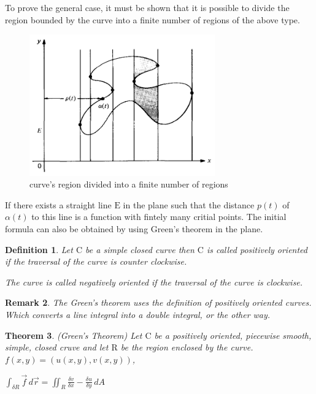 \documentclass[a4paper]{book}
\newtheorem{theorem}{Theorem}%
\newtheorem{remark}[theorem]{Remark}%
\newtheorem{definition}[theorem]{Definition}%
\numberwithin{theorem}{section}%
\begin{document}
To prove the general case, it must be shown that it is possible to divide the region bounded by the curve into a finite number of regions of the above type.
\begin{figure}[hbt!]
    \begin{center}   
        \includegraphics[width=80mm]{Schmidt2}
        \caption{curve's region divided into a finite number of regions}
    \end{center}
\end{figure}\leavevmode\newline\newline
If there exists a straight line $\mathrm{E}$ in the plane such that the distance $p(t)$ of $\alpha(t)$ to this line is a function with fintely many critial points. The initial formula can also be obtained by using Green's theorem in the plane.

\begin{definition}
    Let $\mathrm{C}$ be a simple closed curve then $\mathrm{C}$ is called positively oriented if the traversal of the curve is counter clockwise.

    The curve is called negatively oriented if the traversal of the curve is clockwise. 
\end{definition}

\begin{remark}
    The Green's theorem uses the definition of positively oriented curves. Which converts a line integral into a double integral, or the other way.
\end{remark}

\begin{theorem} (Green's Theorem)
    Let $\mathrm{C}$ be a positively oriented, piecewise smooth, simple, closed cruve and let $\mathrm{R}$ be the region enclosed by the curve. $f(x,y)=(u(x,y),v(x,y))$,

    \begin{center}
        $\displaystyle \int_{\delta R}\overrightarrow{f}\,d\overrightarrow{r}=\iint_{R}\frac{\delta v}{\delta x}-\frac{\delta u}{\delta y}\,dA$
    \end{center}
\end{theorem}
\end{document}

